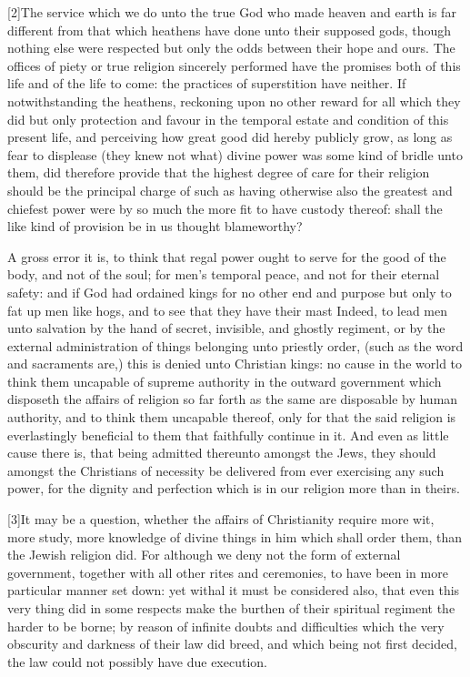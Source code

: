 [2]The service which we do unto the true God who made heaven and earth is far different from that which heathens have done unto their supposed gods, though nothing else were respected but only the odds between their hope and ours. The offices of piety or true religion sincerely performed have the promises both of this life and of the life to come: the practices of superstition have neither. If notwithstanding the heathens, reckoning upon no other reward for all which they did but only protection and favour in the temporal estate and condition of this present life, and perceiving how great good did hereby publicly grow, as long as fear to displease (they knew not what) divine power was some kind of bridle unto them, did therefore provide that the highest degree of care for their religion should be the principal charge of such as having otherwise also the greatest and chiefest power were by so much the more fit to have custody thereof: shall the like kind of provision be in us thought blameworthy?

A gross error it is, to think that regal power ought to serve for the good of the body, and not of the soul; for men’s temporal peace, and not for their eternal safety: and if God had ordained kings for no other end and purpose but only to fat up men like hogs, and to see that they have their mast Indeed, to lead men unto salvation by the hand of secret, invisible, and ghostly regiment, or by the external administration of things belonging unto priestly order, (such as the word and sacraments are,) this is denied unto Christian kings: no cause in the world to think them uncapable of supreme authority in the outward government which disposeth the affairs of religion so far forth as the same are disposable by human authority, and to think them uncapable thereof, only for that the said religion is everlastingly beneficial to them that faithfully continue in it. And even as little cause there is, that being admitted thereunto amongst the Jews, they should amongst the Christians of necessity be delivered from ever exercising any such power, for the  dignity and perfection which is in our religion more than in theirs.

[3]It may be a question, whether the affairs of Christianity require more wit, more study, more knowledge of divine things in him which shall order them, than the Jewish religion did. For although we deny not the form of external government, together with all other rites and ceremonies, to have been in more particular manner set down: yet withal it must be considered also, that even this very thing did in some respects make the burthen of their spiritual regiment the harder to be borne; by reason of infinite doubts and difficulties which the very obscurity and darkness of their law did breed, and which being not first decided, the law could not possibly have due execution.

